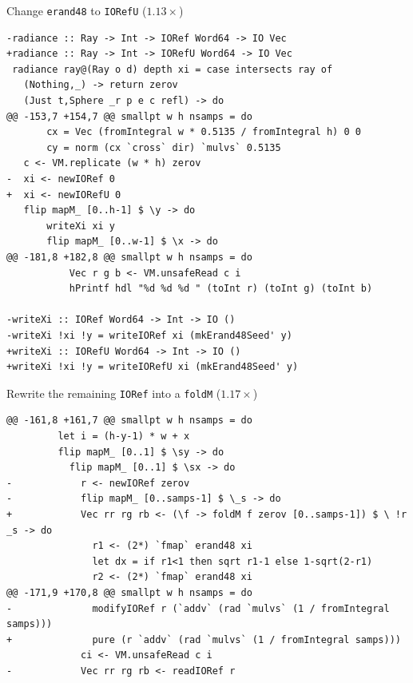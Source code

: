 \documentclass[8pt]{beamer}
\begin{document}
\begin{frame}[fragile]{Change \texttt{erand48} to \texttt{IORefU} ($1.13\times$)}

\begin{verbatim}
-radiance :: Ray -> Int -> IORef Word64 -> IO Vec
+radiance :: Ray -> Int -> IORefU Word64 -> IO Vec
 radiance ray@(Ray o d) depth xi = case intersects ray of
   (Nothing,_) -> return zerov
   (Just t,Sphere _r p e c refl) -> do
@@ -153,7 +154,7 @@ smallpt w h nsamps = do
       cx = Vec (fromIntegral w * 0.5135 / fromIntegral h) 0 0
       cy = norm (cx `cross` dir) `mulvs` 0.5135
   c <- VM.replicate (w * h) zerov
-  xi <- newIORef 0
+  xi <- newIORefU 0
   flip mapM_ [0..h-1] $ \y -> do
       writeXi xi y
       flip mapM_ [0..w-1] $ \x -> do
@@ -181,8 +182,8 @@ smallpt w h nsamps = do
           Vec r g b <- VM.unsafeRead c i
           hPrintf hdl "%d %d %d " (toInt r) (toInt g) (toInt b)
 
-writeXi :: IORef Word64 -> Int -> IO ()
-writeXi !xi !y = writeIORef xi (mkErand48Seed' y)
+writeXi :: IORefU Word64 -> Int -> IO ()
+writeXi !xi !y = writeIORefU xi (mkErand48Seed' y)
\end{verbatim}
\end{frame}



\begin{frame}[fragile]{Rewrite the remaining \texttt{IORef} into a \texttt{foldM} ($1.17\times$) }
\begin{verbatim}
@@ -161,8 +161,7 @@ smallpt w h nsamps = do
         let i = (h-y-1) * w + x
         flip mapM_ [0..1] $ \sy -> do
           flip mapM_ [0..1] $ \sx -> do
-            r <- newIORef zerov
-            flip mapM_ [0..samps-1] $ \_s -> do
+            Vec rr rg rb <- (\f -> foldM f zerov [0..samps-1]) $ \ !r _s -> do
               r1 <- (2*) `fmap` erand48 xi
               let dx = if r1<1 then sqrt r1-1 else 1-sqrt(2-r1)
               r2 <- (2*) `fmap` erand48 xi
@@ -171,9 +170,8 @@ smallpt w h nsamps = do
-              modifyIORef r (`addv` (rad `mulvs` (1 / fromIntegral samps)))
+              pure (r `addv` (rad `mulvs` (1 / fromIntegral samps)))
             ci <- VM.unsafeRead c i
-            Vec rr rg rb <- readIORef r
\end{verbatim}
\end{frame}

\end{document}
